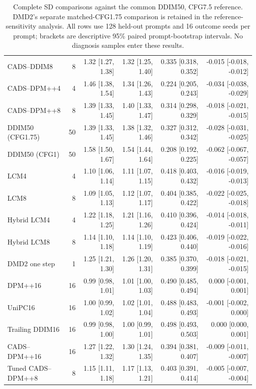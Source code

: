 \begin{table}[t]
\begin{tabular}{lrrrrr}
CADS--DDIM8 & 8 & 1.32 [1.27, 1.38] & 1.32 [1.25, 1.40] & 0.335 [0.318, 0.352] & -0.015 [-0.018, -0.012] \\
CADS--DPM++4 & 4 & 1.46 [1.38, 1.54] & 1.34 [1.26, 1.43] & 0.224 [0.205, 0.243] & -0.034 [-0.038, -0.029] \\
CADS--DPM++8 & 8 & 1.39 [1.33, 1.45] & 1.40 [1.33, 1.47] & 0.314 [0.298, 0.329] & -0.018 [-0.021, -0.015] \\
DDIM50 (CFG1.75) & 50 & 1.39 [1.33, 1.45] & 1.38 [1.32, 1.46] & 0.327 [0.312, 0.342] & -0.028 [-0.031, -0.025] \\
DDIM50 (CFG1) & 50 & 1.58 [1.50, 1.67] & 1.54 [1.44, 1.64] & 0.208 [0.192, 0.225] & -0.062 [-0.067, -0.057] \\
LCM4 & 4 & 1.10 [1.06, 1.14] & 1.11 [1.07, 1.15] & 0.418 [0.403, 0.432] & -0.016 [-0.019, -0.013] \\
LCM8 & 8 & 1.09 [1.05, 1.13] & 1.12 [1.07, 1.17] & 0.404 [0.385, 0.422] & -0.022 [-0.025, -0.018] \\
Hybrid LCM4 & 4 & 1.22 [1.18, 1.25] & 1.21 [1.16, 1.26] & 0.410 [0.396, 0.424] & -0.014 [-0.018, -0.011] \\
Hybrid LCM8 & 8 & 1.14 [1.10, 1.18] & 1.14 [1.10, 1.19] & 0.423 [0.406, 0.440] & -0.019 [-0.022, -0.016] \\
DMD2 one step & 1 & 1.25 [1.21, 1.30] & 1.26 [1.20, 1.31] & 0.385 [0.370, 0.399] & -0.018 [-0.021, -0.015] \\
DPM++16 & 16 & 0.99 [0.98, 1.01] & 1.01 [1.00, 1.03] & 0.490 [0.485, 0.494] & 0.000 [-0.001, 0.001] \\
UniPC16 & 16 & 1.00 [0.99, 1.02] & 1.02 [1.01, 1.04] & 0.488 [0.483, 0.493] & -0.001 [-0.002, 0.000] \\
Trailing DDIM16 & 16 & 0.99 [0.98, 1.00] & 1.00 [0.99, 1.01] & 0.498 [0.493, 0.503] & 0.000 [0.000, 0.001] \\
CADS--DPM++16 & 16 & 1.27 [1.22, 1.32] & 1.30 [1.24, 1.35] & 0.394 [0.381, 0.407] & -0.009 [-0.011, -0.007] \\
Tuned CADS--DPM++8 & 8 & 1.15 [1.11, 1.18] & 1.17 [1.13, 1.21] & 0.403 [0.391, 0.414] & -0.005 [-0.007, -0.004] \\
\bottomrule
\end{tabular}
\caption{Complete SD comparisons against the common DDIM50, CFG7.5 reference. DMD2's separate matched-CFG1.75 comparison is retained in the reference-sensitivity analysis. All rows use 128 held-out prompts and 16 outcome seeds per prompt; brackets are descriptive 95\% paired prompt-bootstrap intervals. No diagnosis samples enter these results.}
\label{tab:t2i_all_outcomes}
\end{table}

